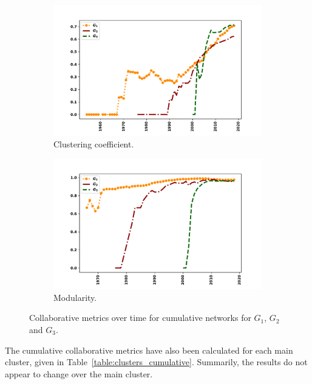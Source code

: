 \documentclass{article}
\theoremstyle{definition}
\begin{document}
\begin{figure}[!hbtp]
    \begin{subfigure}{.45\textwidth}\centering
        \includegraphics[width=1.1\textwidth]{./assets/images/clustering_coeff_over_time.pdf}
        \caption{Clustering coefficient.}\label{fig:clustering_coefficient}
     \end{subfigure}
     \begin{subfigure}{.45\textwidth}\centering
        \includegraphics[width=1.1\textwidth]{./assets/images/modularity_over_time.pdf}
        \caption{Modularity.}\label{fig:modularity}
     \end{subfigure}
    \caption{Collaborative metrics over time for cumulative networks for \(G_1\),
    \(G_2\) and \(G_3\).}\label{fig:cumulative_networks}
\end{figure}

The cumulative collaborative metrics have also been calculated for each main
cluster, given in Table~\ref{table:clusters_cumulative}. Summarily, the results
do not appear to change over the main cluster.
\end{document}
